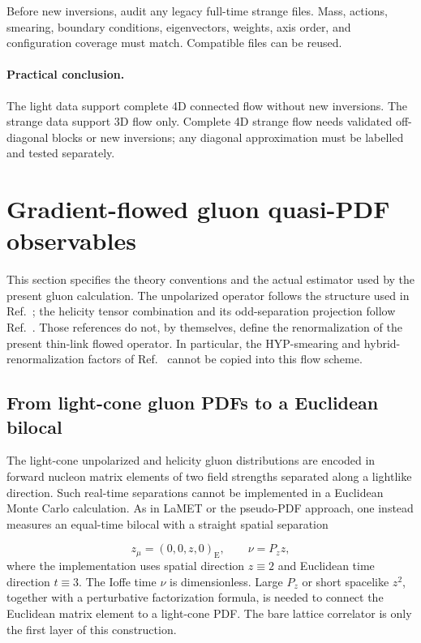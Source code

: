\documentclass[11pt]{article}
\numberwithin{equation}{section}
\begin{document}
Before new inversions, audit any legacy full-time strange files. Mass, actions,
smearing, boundary conditions, eigenvectors, weights, axis order, and
configuration coverage must match. Compatible files can be reused.

\paragraph{Practical conclusion.}
The light data support complete 4D connected flow without new inversions. The
strange data support 3D flow only. Complete 4D strange flow needs validated
off-diagonal blocks or new inversions; any diagonal approximation must be
labelled and tested separately.

\section{Gradient-flowed gluon quasi-PDF observables}
\label{sec:flowed-gluon}

This section specifies the theory conventions and the actual estimator used
by the present gluon calculation.  The unpolarized operator follows the
structure used in Ref.~\cite{ChenEtAl2025GluonPDF}; the helicity tensor
combination and its odd-separation projection follow
Ref.~\cite{EgererEtAl2022GluonHelicity}.  Those references do not, by
themselves, define the renormalization of the present thin-link flowed
operator.  In particular, the HYP-smearing and hybrid-renormalization factors
of Ref.~\cite{ChenEtAl2025GluonPDF} cannot be copied into this flow scheme.

\subsection{From light-cone gluon PDFs to a Euclidean bilocal}

The light-cone unpolarized and helicity gluon distributions are encoded in
forward nucleon matrix elements of two field strengths separated along a
lightlike direction.  Such real-time separations cannot be implemented in a
Euclidean Monte Carlo calculation.  As in LaMET or the pseudo-PDF approach,
one instead measures an equal-time bilocal with a straight spatial separation

\begin{equation}
  z_\mu=(0,0,z,0)_{\mathrm E},
  \qquad
  \nu=P_z z,
  \label{eq:gluon-ioffe-time}
\end{equation}
where the implementation uses spatial direction \(z\equiv2\) and Euclidean
time direction \(t\equiv3\).  The Ioffe time \(\nu\) is dimensionless.
Large \(P_z\) or short spacelike \(z^2\), together with a perturbative
factorization formula, is needed to connect the Euclidean matrix element to a
light-cone PDF.  The bare lattice correlator is only the first layer of this
construction.
\end{document}
